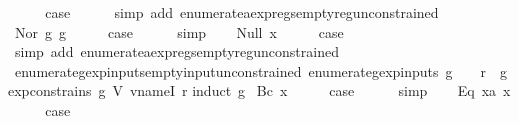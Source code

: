 \begin{isabellebody}
\ \ \isamarkupfalse%
\ \isamarkupfalse%
\ {\isacharquery}case\isanewline
\ \ \ \ \isamarkupfalse%
\ {\isacharparenleft}simp\ add{\isacharcolon}\ enumerate{\isacharunderscore}aexp{\isacharunderscore}regs{\isacharunderscore}empty{\isacharunderscore}reg{\isacharunderscore}unconstrained{\isacharparenright}\isanewline
{}\isamarkupfalse%
\isanewline
\ \ \isamarkupfalse%
\ {\isacharparenleft}Nor\ g{}\ g{}{\isacharparenright}\isanewline
\ \ \isamarkupfalse%
\ \isamarkupfalse%
\ {\isacharquery}case\isanewline
\ \ \ \ \isamarkupfalse%
\ simp\isanewline
{}\isamarkupfalse%
\isanewline
\ \ \isamarkupfalse%
\ {\isacharparenleft}Null\ x{\isacharparenright}\isanewline
\ \ \isamarkupfalse%
\ \isamarkupfalse%
\ {\isacharquery}case\isanewline
\ \ \ \ \isamarkupfalse%
\ {\isacharparenleft}simp\ add{\isacharcolon}\ enumerate{\isacharunderscore}aexp{\isacharunderscore}regs{\isacharunderscore}empty{\isacharunderscore}reg{\isacharunderscore}unconstrained{\isacharparenright}\isanewline
{}\isamarkupfalse%
%
\endisatagproof
{\isafoldproof}%
%
\isadelimproof
\isanewline
%
\endisadelimproof
\isanewline
{}\isamarkupfalse%
\ enumerate{\isacharunderscore}gexp{\isacharunderscore}inputs{\isacharunderscore}empty{\isacharunderscore}input{\isacharunderscore}unconstrained{\isacharcolon}\ {\isachardoublequoteopen}enumerate{\isacharunderscore}gexp{\isacharunderscore}inputs\ g\ {\isacharequal}\ {\isacharbraceleft}{\isacharbraceright}\ {\isasymLongrightarrow}\ {\isasymforall}r{\isachardot}\ {\isasymnot}\ gexp{\isacharunderscore}constrains\ g\ {\isacharparenleft}V\ {\isacharparenleft}vname{\isachardot}I\ r{\isacharparenright}{\isacharparenright}{\isachardoublequoteclose}\isanewline
%
\isadelimproof
%
\endisadelimproof
%
\isatagproof
{}\isamarkupfalse%
{\isacharparenleft}induct\ g{\isacharparenright}\isanewline
{}\isamarkupfalse%
\ {\isacharparenleft}Bc\ x{\isacharparenright}\isanewline
\ \ \isamarkupfalse%
\ \isamarkupfalse%
\ {\isacharquery}case\isanewline
\ \ \ \ \isamarkupfalse%
\ simp\isanewline
{}\isamarkupfalse%
\isanewline
\ \ \isamarkupfalse%
\ {\isacharparenleft}Eq\ x{}a\ x{}{\isacharparenright}\isanewline
\ \ \isamarkupfalse%
\ \isamarkupfalse%
\ {\isacharquery}case\isanewline

\end{isabellebody}
